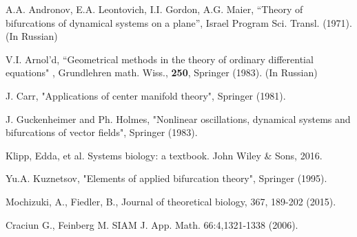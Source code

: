 \documentclass[ amsmath,amssymb,nofootinbib
]{revtex4-1}
\begin{document}

\begin{thebibliography}{99}




	A.A. Andronov, E.A. Leontovich, I.I. Gordon, A.G. Maier,
``Theory of bifurcations of dynamical systems on a plane'', Israel Program Sci. Transl. (1971). (In Russian)

	V.I. Arnol'd,
``Geometrical methods in the theory of ordinary differential equations" ,
Grundlehren math. Wiss., {\bf 250}, Springer (1983). (In Russian)




  J. Carr,
"Applications of center manifold theory", Springer (1981).









	J. Guckenheimer and  Ph. Holmes,
"Nonlinear oscillations, dynamical systems and bifurcations of vector fields", Springer (1983).


Klipp, Edda, et al. Systems biology: a textbook. John Wiley \& Sons, 2016.

 Yu.A. Kuznetsov,
"Elements of applied bifurcation theory",
Springer (1995).





Mochizuki, A.,  Fiedler, B.,%
Journal of theoretical biology, 367, 189-202  (2015).




Craciun G., Feinberg M.  %
SIAM J. App. Math. 66:4,1321-1338 (2006).


\end{thebibliography}
\end{document}
